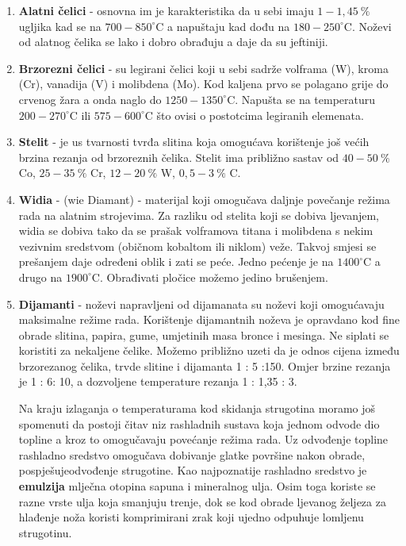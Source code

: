 \documentclass[a4paper,12pt]{article}
\numberwithin{figure}{section}
\begin{document}
\begin{enumerate}
\item \textbf{Alatni čelici} - osnovna im je karakteristika da u sebi imaju $1-1,45\:\%$ ugljika kad se na $700 - 850^{\circ}$C a napuštaju kad dođu na $180 - 250^{\circ}$C. Noževi od alatnog čelika se lako i dobro obrađuju a daje da su jeftiniji.
\item \textbf{Brzorezni čelici} - su legirani čelici koji u sebi sadrže volframa (W), kroma (Cr), vanadija (V) i molibdena (Mo). Kod kaljena prvo se polagano grije do crvenog žara a onda naglo do $1250 - 1350^{\circ}$C. Napušta se na temperaturu $200 - 270^{\circ}$C ili $575 - 600^{\circ}$C što ovisi o postotcima legiranih elemenata.
\item \textbf{Stelit} - je us tvarnosti tvrđa slitina koja omogućava korištenje još većih brzina rezanja od brzoreznih čelika. Stelit ima približno sastav od $40-50\:\%$ Co, $25 - 35\:\%$ Cr, $12 - 20\:\%$ W, $0,5-3\:\%$ C.
\item \textbf{Widia} - (wie Diamant) - materijal koji omogučava daljnje povečanje režima rada na alatnim strojevima. Za razliku od stelita koji se dobiva ljevanjem, widia se dobiva tako da se prašak volframova titana i molibdena s nekim vezivnim sredstvom (običnom kobaltom ili niklom) veže. Takvoj smjesi se prešanjem daje određeni oblik i zati se peće. Jedno pećenje je na $1400^{\circ}$C a drugo na $1900^{\circ}$C. Obrađivati pločice možemo jedino brušenjem.
\item \textbf{Dijamanti} - noževi napravljeni od dijamanata su noževi koji omogućavaju maksimalne režime rada. Korištenje dijamantnih noževa je opravdano kod fine obrade slitina, papira, gume, umjetinih masa bronce i mesinga. Ne siplati se koristiti za nekaljene čelike. Možemo približno uzeti da je odnos cijena između brzorezanog čelika, trvde slitine i dijamanta 1 : 5 :150. Omjer brzine rezanja je 1 : 6: 10, a dozvoljene temperature rezanja 1 : 1,35 : 3.\par
Na kraju izlaganja o temperaturama kod skidanja strugotina moramo još spomenuti da postoji čitav niz rashladnih sustava koja jednom odvode dio topline a kroz to omogučavaju povećanje režima rada. Uz odvođenje topline rashladno sredstvo omogučava dobivanje glatke površine nakon obrade, pospješujeodvođenje strugotine. Kao najpoznatije rashladno sredstvo je \textbf{emulzija} mlječna otopina sapuna i mineralnog ulja. Osim toga koriste se razne vrste ulja koja smanjuju trenje, dok se kod obrade ljevanog željeza za hlađenje noža koristi komprimirani zrak koji ujedno odpuhuje lomljenu strugotinu.
\end{enumerate}
\end{document}
